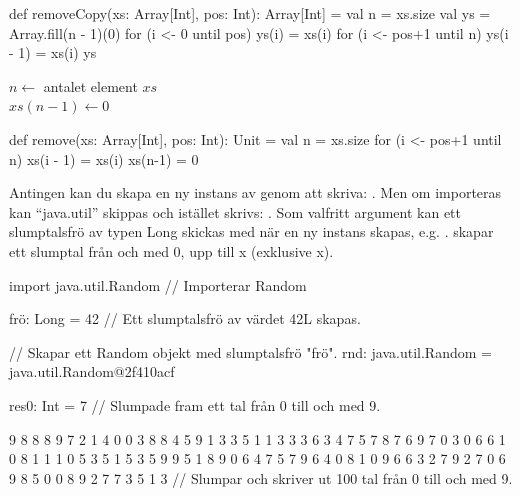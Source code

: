 {\Subtask \begin{Code}
def removeCopy(xs: Array[Int], pos: Int): Array[Int] = {
  val n = xs.size
  val ys = Array.fill(n - 1)(0)
  for (i <- 0 until pos) ys(i) = xs(i)
  for (i <- pos+1 until n) ys(i - 1) = xs(i)
  ys
} 
\end{Code}


\Task %

\Subtask  

\begin{algorithm}[H]
 
 $n \leftarrow$ antalet element $xs$\\ 
 $xs(n - 1) \leftarrow 0$ \\
\end{algorithm}

\Subtask \begin{Code}
def remove(xs: Array[Int], pos: Int): Unit = {
  val n = xs.size
  for (i <- pos+1 until n) xs(i - 1) = xs(i)
  xs(n-1) = 0
} 
\end{Code}


\Task %

\Subtask Antingen kan du skapa en ny instans av  genom att skriva: . 
Men om  importeras kan “java.util” skippas och istället skrivs: . 
Som valfritt argument kan ett slumptalsfrö av typen Long skickas med när en ny instans skapas, e.g. .
 skapar ett slumptal från och med 0, upp till x (exklusive x).

\Subtask \begin{REPL}
import java.util.Random // Importerar Random

frö: Long = 42 // Ett slumptalsfrö av värdet 42L skapas.

  // Skapar ett Random objekt med slumptalsfrö "frö".
rnd: java.util.Random = java.util.Random@2f410acf 

res0: Int = 7 // Slumpade fram ett tal från 0 till och med 9.

9 8 8 8 9 7 2 1 4 0 0 3 8 8 4 5 9 1 3 3 5 1 1 
3 3 3 6 3 4 7 5 7 8 7 6 9 7 0 3 0 6 6 1 0 8 1 
1 1 0 5 3 5 1 5 3 5 9 9 5 1 8 9 0 6 4 7 5 7 9 
6 4 0 8 1 0 9 6 6 3 2 7 9 2 7 0 6 9 8 5 0 0 8 
9 2 7 7 3 5 1 3 // Slumpar och skriver ut 100 tal från 0 till och med 9.


\end{REPL}}
